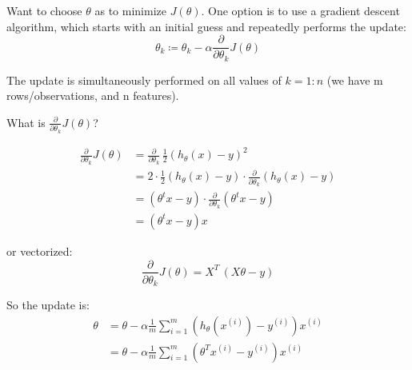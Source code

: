 \documentclass[12pt]{article}
\begin{document}
Want to choose $\theta$ as to minimize $J(\theta)$. One option is to use a gradient descent algorithm, which starts with an initial guess and repeatedly performs the update:
\[
\theta_{k} \coloneqq \theta_k - \alpha \frac{\partial}{\partial \theta_k} J(\theta)
\]

The update is simultaneously performed on all values of $k = 1:n$ (we have m rows/observations, and n features).

What is $\frac{\partial}{\partial \theta_k} J(\theta)$?

\begin{align*}
\frac{\partial}{\partial \theta_k} J(\theta)
&= \frac{\partial}{\partial \theta_k} \, \frac{1}{2}\left( h_\theta(x) - y\right)^2
\\
&= 2 \cdot \frac{1}{2}\left( h_\theta(x) - y\right) \cdot\frac{\partial}{\partial \theta_k} \left( h_\theta(x) - y\right)
\\
&= \left( \theta^t x - y\right) \cdot\frac{\partial}{\partial \theta_k} \left( \theta^t x - y\right)
\\
&= \left( \theta^t x - y\right) x
%
%
\end{align*}

or vectorized:
\[
\frac{\partial}{\partial \theta_k} J(\theta) = X^T \, (X\theta - y)
\]


So the update is:
\begin{align}
\theta 
&= \theta - \alpha\frac{1}{m} 
	\sum_{i=1}^m 
	\left( h_\theta (x^{(i)}) - y^{(i)} \right) x^{(i)} \\&= \theta - \alpha\frac{1}{m} 
	\sum_{i=1}^m 
	\left( \theta^T x^{(i)} - y^{(i)}\right) x^{(i)}
	\end{align}
\end{document}
